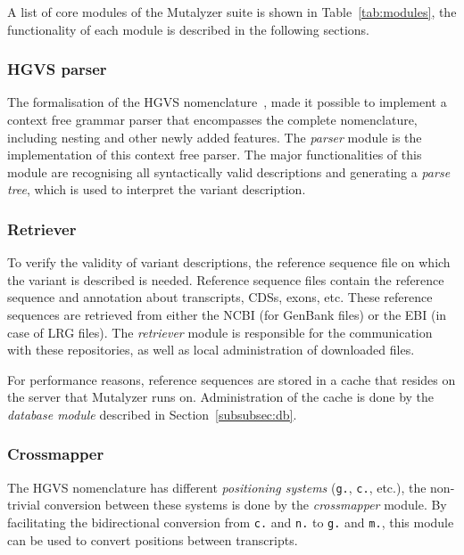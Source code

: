 \documentclass{article}
\begin{document}
A list of core modules of the Mutalyzer suite is shown in
Table~\ref{tab:modules}, the functionality of each module is described in the
following sections.

\subsubsection{HGVS parser} \label{subsubsec:parser}
The formalisation of the HGVS nomenclature~\cite{hgvs_bnf}, made it possible to
implement a context free grammar parser that encompasses the complete
nomenclature, including nesting and other newly added features. The
\emph{parser} module is the implementation of this context free parser. The
major functionalities of this module are recognising all syntactically valid
descriptions and generating a \emph{parse tree}, which is used to interpret the
variant description.

\subsubsection{Retriever} \label{subsubsec:retriever}
To verify the validity of variant descriptions, the reference sequence file on
which the variant is described is needed. Reference sequence files contain the
reference sequence and annotation about transcripts, CDSs, exons, etc. These
reference sequences are retrieved from either the NCBI (for GenBank files) or
the EBI (in case of LRG files). The \emph{retriever} module is responsible for
the communication with these repositories, as well as local administration of
downloaded files.

For performance reasons, reference sequences are stored in a cache that resides
on the server that Mutalyzer runs on. Administration of the cache is done by
the \emph{database module} described in Section~\ref{subsubsec:db}.

\subsubsection{Cross\-mapper} \label{subsubsec:crossmap}
The HGVS nomenclature has different \emph{positioning systems} (\texttt{g.},
\texttt{c.}, etc.), the non-trivial conversion between these systems is done by
the \emph{cross\-mapper} module. By facilitating the bidirectional conversion
from \texttt{c.} and \texttt{n.} to \texttt{g.} and \texttt{m.}, this module
can be used to convert positions between transcripts.

\end{document}
